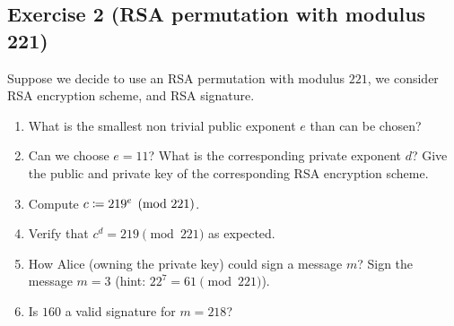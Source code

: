 \subsection{Exercise 2 (RSA permutation with modulus 221)}

Suppose we decide to use an RSA permutation with modulus $221$, we consider RSA encryption scheme, and RSA signature.
\begin{enumerate}
	\item What is the smallest non trivial public exponent $e$ than can be
	chosen?
	\item Can we choose $e=11$? What is the corresponding private exponent $d$? Give the public and private key of the corresponding RSA encryption scheme.
	\item Compute $c \coloneqq 219^e \pmod{221}$.
	\item Verify that $c^d = 219 \pmod{221}$ as expected.
	\item How Alice (owning the private key) could sign a message $m$? Sign the message $m=3$ (hint: $22^7= 61 \pmod{221}$).
	\item Is $160$ a valid signature for $m=218$?
\end{enumerate}


